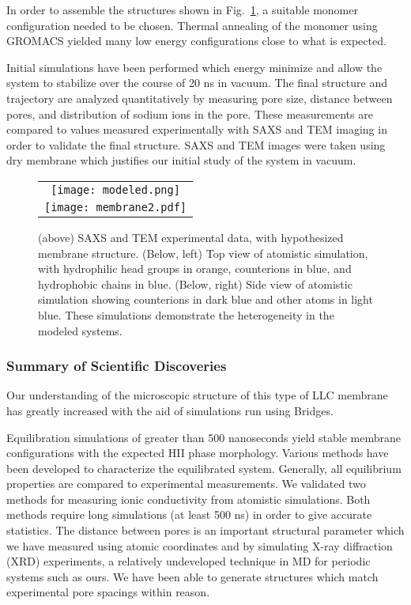 In order to assemble the structures shown in Fig.~\ref{figure:membrane}, a
suitable monomer configuration needed to be chosen. Thermal annealing
of the monomer using GROMACS yielded many low energy configurations
close to what is expected. 

Initial simulations have been performed which energy minimize and
allow the system to stabilize over the course of 20 ns in vacuum.  The
final structure and trajectory are analyzed quantitatively by
measuring pore size, distance between pores, and distribution of
sodium ions in the pore. These measurements are compared to values
measured experimentally with SAXS and TEM imaging in order to validate
the final structure. SAXS and TEM images were taken using dry membrane
which justifies our initial study of the system in vacuum.

\begin{figure}[h]
\begin{center}
\begin{tabular}{c}
\texttt{[image: modeled.png]}\\
\texttt{[image: membrane2.pdf]}\\
\end{tabular}
\end{center}
\caption{(above) SAXS and TEM experimental data, with hypothesized
  membrane structure. (Below, left) Top view of atomistic simulation,
  with hydrophilic head groups in orange, counterions in blue, and
  hydrophobic chains in blue. (Below, right) Side view of atomistic
  simulation showing counterions in dark blue and other atoms in light
  blue. These simulations demonstrate the heterogeneity in the
  modeled systems.~\label{figure:membrane}}
\end{figure}

\subsubsection*{Summary of Scientific Discoveries}

Our understanding of the microscopic structure of this type of LLC
membrane has greatly increased with the aid of simulations run using
Bridges. 

Equilibration simulations of greater than 500 nanoseconds yield
stable membrane configurations with the expected HII phase 
morphology. Various methods have been developed to characterize
the equilibrated system. Generally, all equilibrium properties are
compared to experimental measurements. We validated two methods
for measuring ionic conductivity from atomistic simulations. Both 
methods require long simulations (at least 500 ns) in order to give
accurate statistics. The distance between pores is an important
structural parameter which we have measured using atomic coordinates
and by simulating X-ray diffraction (XRD) experiments, a relatively
undeveloped technique in MD for periodic systems such as ours. We 
have been able to generate structures which match experimental pore
spacings within reason.

